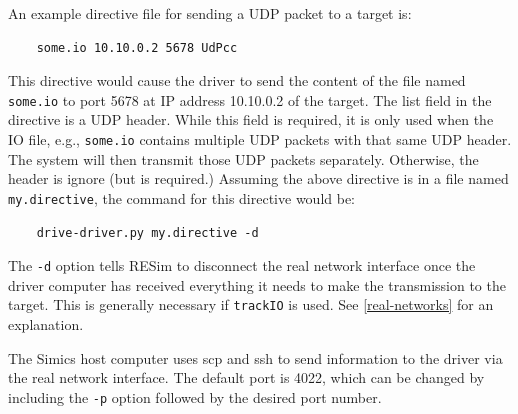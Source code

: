 \documentclass[titlepage]{article}
\begin{document}
An example directive file for sending a UDP packet to a target is:
\begin{verbatim}
    some.io 10.10.0.2 5678 UdPcc
\end{verbatim}
This directive would cause the driver to send the content of the file named {\tt some.io} to port 5678 at IP address 10.10.0.2 of the target.
The list field in the directive is a UDP header.  While this field is required, it is only used when the IO file, e.g., {\tt some.io} contains multiple
UDP packets with that same UDP header.  The system will then transmit those UDP packets separately.  Otherwise, the header is ignore (but is required.)
Assuming the above directive is in a file named {\tt my.directive}, the command for this directive would be:
\begin{verbatim}
    drive-driver.py my.directive -d
\end{verbatim}
\noindent The {\tt -d} option tells RESim to disconnect the real network interface once the driver computer has received everything it needs to make
the transmission to the target.  This is generally necessary if {\tt trackIO} is used.  See \ref{real-networks} for an explanation.

The Simics host computer uses scp and ssh to send information to the driver via the real network interface.  The default port is 4022, which can be changed
by including the {\tt -p} option followed by the desired port number.
\end{document}
